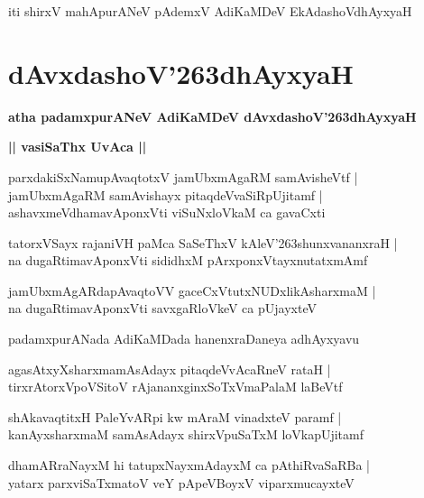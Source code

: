 \documentclass[twoside,12pt,openright]{book}
\def\S{\char'263}
\newcounter{shloka}[chapter]
\def\uvaca#1{\centerline{{\large\textbf{#1}}}}
\begin{document}
\begin{center}
iti shirxV mahApurANeV pAdemxV AdiKaMDeV EkAdashoVdhAyxyaH
\end{center}

\chapter{dAvxdashoV\S dhAyxyaH}

\begin{center}
{\LARGE\bfseries atha padamxpurANeV AdiKaMDeV dAvxdashoV\S dhAyxyaH}
\end{center}

\uvaca{|| vasiSaThx UvAca ||}

\begin{shloka}
parxdakiSxNamupAvaqtotxV jamUbxmAgaRM samAvisheVtf |\\
jamUbxmAgaRM samAvishayx pitaqdeVvaSiRpUjitamf |\\
ashavxmeVdhamavAponxVti viSuNxloVkaM ca gavaCxti
\end{shloka}

\begin{shloka}
tatorxVSayx rajaniVH paMca SaSeThxV kAleV\S shunxvananxraH |\\
na dugaRtimavAponxVti sididhxM pArxponxVtayxnutatxmAmf
\end{shloka}

\begin{shloka}
jamUbxmAgARdapAvaqtoVV gaceCxVtutxNUDxlikAsharxmaM |\\
na dugaRtimavAponxVti savxgaRloVkeV ca pUjayxteV
\end{shloka}

\begin{center}
padamxpurANada AdiKaMDada hanenxraDaneya adhAyxyavu
\end{center}

\begin{shloka}
agasAtxyXsharxmamAsAdayx pitaqdeVvAcaRneV rataH |\\
tirxrAtorxVpoVSitoV rAjananxginxSoTxVmaPalaM laBeVtf
\end{shloka}

\begin{shloka}
shAkavaqtitxH PaleYvARpi kw mAraM vinadxteV paramf |\\
kanAyxsharxmaM samAsAdayx shirxVpuSaTxM loVkapUjitamf
\end{shloka}

\begin{shloka}
dhamARraNayxM hi tatupxNayxmAdayxM ca pAthiRvaSaRBa |\\
yatarx parxviSaTxmatoV veY pApeVBoyxV viparxmucayxteV
\end{shloka}
\end{document}
